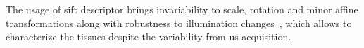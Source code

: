 \documentclass[a4paper, 10pt, conference]{llncs}      %
\begin{document}

The usage of \ac{sift} descriptor brings invariability to scale, rotation and minor affine transformations along with robustness to illumination changes~\cite{lowe2004distinctive}, which allows to characterize the tissues despite the variability from \ac{us} acquisition.

\end{document}
